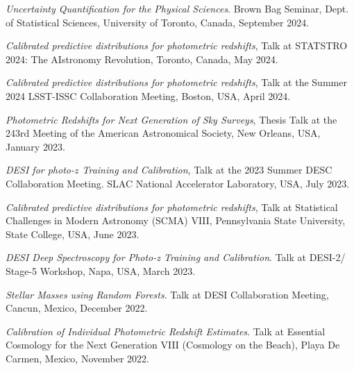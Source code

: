 
 \begin{etaremune}[leftmargin=40pt,labelsep=10pt]
 
\item \textit{Uncertainty Quantification for the Physical Sciences}. Brown Bag Seminar, Dept. of Statistical Sciences, University of Toronto, Canada, September 2024.
     \item \textit{Calibrated predictive distributions for photometric redshifts}, Talk at STATSTRO 2024: The AIstronomy Revolution, Toronto, Canada, May 2024.
    \item \textit{Calibrated predictive distributions for photometric redshifts}, Talk at the Summer 2024 LSST-ISSC Collaboration Meeting, Boston, USA, April 2024.
    \item \textit{Photometric Redshifts for Next Generation of Sky Surveys}, Thesis Talk at the 243rd Meeting of the American Astronomical Society, New Orleans, USA, January 2023.
    \item \textit{DESI for photo-$z$ Training and Calibration}, Talk at the 2023 Summer DESC Collaboration Meeting. SLAC National Accelerator Laboratory, USA, July 2023.
    \item \textit{Calibrated predictive distributions for photometric redshifts}, Talk at Statistical Challenges in Modern Astronomy (SCMA) VIII, Pennsylvania State University, State College, USA, June 2023.
    \item \textit{DESI Deep Spectroscopy for Photo-z Training and Calibration}. Talk at DESI-2/ Stage-5 Workshop, Napa, USA, March 2023.
    \item \textit{Stellar Masses using Random Forests}. Talk at DESI Collaboration Meeting, Cancun, Mexico, December 2022.
    \item \textit{Calibration of Individual Photometric Redshift Estimates}. Talk at Essential Cosmology for the Next Generation VIII (Cosmology on the Beach), Playa De Carmen, Mexico, November 2022.

\end{etaremune}
